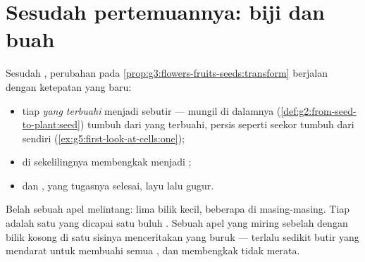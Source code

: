 \section{Sesudah pertemuannya: biji dan buah}

\begin{proposition}\label{prop:g5:flower-to-fruit:becomes}
Sesudah , perubahan pada
\cref{prop:g3:flowers-fruits-seeds:transform} berjalan dengan
ketepatan yang baru:
\begin{itemize}
  \item tiap \emph{ yang terbuahi} menjadi sebutir
        \emph{} ---  mungil di dalamnya
        (\cref{def:g2:from-seed-to-plant:seed}) tumbuh dari 
        yang terbuahi, persis seperti seekor  tumbuh dari  sendiri
        (\cref{ex:g5:first-look-at-cells:one});
  \item \emph{} di sekelilingnya membengkak menjadi
        \emph{};
  \item {} dan , yang tugasnya selesai, layu
        lalu gugur.
\end{itemize}
\end{proposition}
\admitted

\begin{example}\label{ex:g5:flower-to-fruit:pips}
Belah sebuah apel melintang: lima bilik kecil, beberapa  di
masing-masing. Tiap  adalah satu  yang dicapai satu
buluh . Sebuah apel yang miring sebelah dengan bilik kosong
di satu sisinya menceritakan  yang buruk  --- terlalu
sedikit butir yang mendarat untuk membuahi semua , dan
 membengkak tidak merata.
\end{example}

